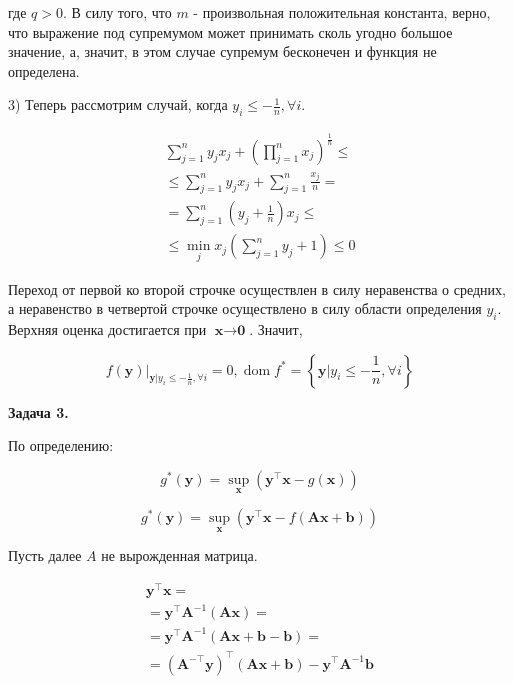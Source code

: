 \documentclass[12pt]{article}
\DeclareMathOperator*{\dom}{dom}
\begin{document}
где $q > 0$. В силу того, что $m$ - произвольная положительная константа, верно, что выражение под супремумом может принимать сколь угодно большое значение, а, значит, в этом случае супремум бесконечен и функция не определена.

3) Теперь рассмотрим случай, когда $y_i \leq -\frac{1}{n}, \forall i$.

\begin{eqnarray}
\sum\limits_{j=1}^n y_jx_j + \left(\prod\limits_{j=1}^nx_j\right)^{\frac{1}{n}} \leq \\
\leq \sum\limits_{j=1}^n y_jx_j + \sum\limits_{j = 1}^n \frac{x_j}{n} = \\
= \sum\limits_{j=1}^n \left(y_j+\frac{1}{n}\right)x_j \leq \\
\leq \min\limits_j x_j \left(\sum\limits_{j=1}^n y_j + 1\right) \leq 0
\end{eqnarray}

Переход от первой ко второй строчке осуществлен в силу неравенства о средних, а неравенство в четвертой строчке осуществлено в силу области определения $y_i$. Верхняя оценка достигается при $\textbf{x}\to\textbf{0}$. Значит, 

$$f(\textbf{y})\Big|_{\textbf{y}|y_i \leq -\frac{1}{n}, \forall i}= 0, \dom f^* = \left\{\textbf{y}|y_i \leq -\frac{1}{n}, \forall i\right\}$$

\begin{center}
	\textbf{Задача 3.}
\end{center}

По определению:

$$g^*(\textbf{y}) = \sup\limits_{\textbf{x}}\left(\textbf{y}^\top \textbf{x} - g(\textbf{x})\right)$$

$$g^*(\textbf{y}) = \sup\limits_{\textbf{x}}\left(\textbf{y}^\top \textbf{x} - f(\textbf{Ax}+\textbf{b})\right)$$

Пусть далее $A$ не вырожденная матрица.

\begin{eqnarray}
\textbf{y}^\top \textbf{x} =\nonumber \\
= \textbf{y}^\top \textbf{A}^{-1} \left(\textbf{A}\textbf{x}\right)=\nonumber\\
= \textbf{y}^\top \textbf{A}^{-1} \left(\textbf{A}\textbf{x} + \textbf{b} - \textbf{b}\right)=\nonumber\\
= (\textbf{A}^{-\top}\textbf{y})^\top\left(\textbf{A}\textbf{x} + \textbf{b}\right)  - \textbf{y}^\top \textbf{A}^{-1} \textbf{b}
\end{eqnarray}
\end{document}
